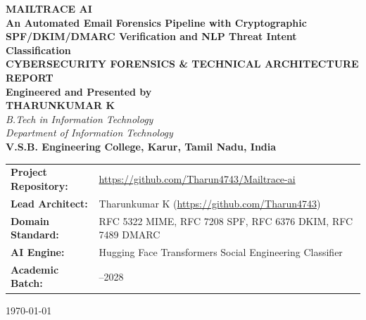 \documentclass[12pt,a4paper]{report}
\begin{document}
\begin{titlepage}
    \centering
    \vspace*{0.8cm}
    
    {\Huge \textbf{MAILTRACE AI}}\\[0.3cm]
    {\LARGE \textbf{An Automated Email Forensics Pipeline with Cryptographic SPF/DKIM/DMARC Verification and NLP Threat Intent Classification}}\\[1.2cm]
    
    {\large \textbf{CYBERSECURITY FORENSICS \& TECHNICAL ARCHITECTURE REPORT}}\\[1.0cm]
    
    \textbf{Engineered and Presented by}\\[0.3cm]
    {\Large \textbf{THARUNKUMAR K}}\\[0.2cm]
    \textit{B.Tech in Information Technology}\\[0.1cm]
    \textit{Department of Information Technology}\\[0.2cm]
    \textbf{V.S.B. Engineering College, Karur, Tamil Nadu, India}\\[1.5cm]
    
    \vfill
    
    \begin{tabular}{>{\raggedright\arraybackslash\bfseries}p{4.2cm}>{\raggedright\arraybackslash}p{10.2cm}}
        Project Repository: & \url{https://github.com/Tharun4743/Mailtrace-ai} \\
        Lead Architect: & Tharunkumar K (\url{https://github.com/Tharun4743}) \\
        Domain Standard: & RFC 5322 MIME, RFC 7208 SPF, RFC 6376 DKIM, RFC 7489 DMARC \\
        AI Engine: & Hugging Face Transformers Social Engineering Classifier \\
        Academic Batch: & 2024--2028 \\
    \end{tabular}
    
    \vspace*{0.8cm}
    {\small \today}
\end{titlepage}

\cleardoublepage
{}
\setcounter{page}{1}
\end{document}
